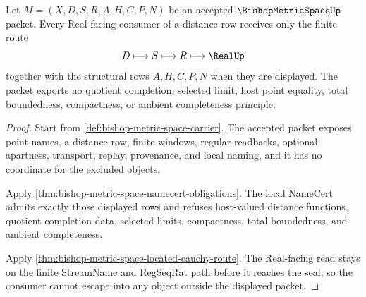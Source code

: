 \begin{theorem}
\label{thm:bishop-metric-space-real-seal-nonescape}
Let $M=(X,D,S,R,A,H,C,P,N)$ be an accepted $\BishopMetricSpaceUp$ packet. Every Real-facing consumer of a distance row receives only the finite route
$$
D \longmapsto S \longmapsto R \longmapsto \RealUp
$$
together with the structural rows $A,H,C,P,N$ when they are displayed. The packet exports no quotient completion, selected limit, host point equality, total boundedness, compactness, or ambient completeness principle.
\end{theorem}
\begin{proof}
Start from \autoref{def:bishop-metric-space-carrier}. The accepted packet exposes point names, a distance row, finite windows, regular readbacks, optional apartness, transport, replay, provenance, and local naming, and it has no coordinate for the excluded objects.

Apply \autoref{thm:bishop-metric-space-namecert-obligations}. The local NameCert admits exactly those displayed rows and refuses host-valued distance functions, quotient completion data, selected limits, compactness, total boundedness, and ambient completeness.

Apply \autoref{thm:bishop-metric-space-located-cauchy-route}. The Real-facing read stays on the finite StreamName and RegSeqRat path before it reaches the seal, so the consumer cannot escape into any object outside the displayed packet.
\end{proof}


\begin{closurestatus}{\BishopMetricSpaceUp}
  \theoryclosure{\seedClosure}
  \formalstatus{\unformalizedV}
\end{closurestatus}
